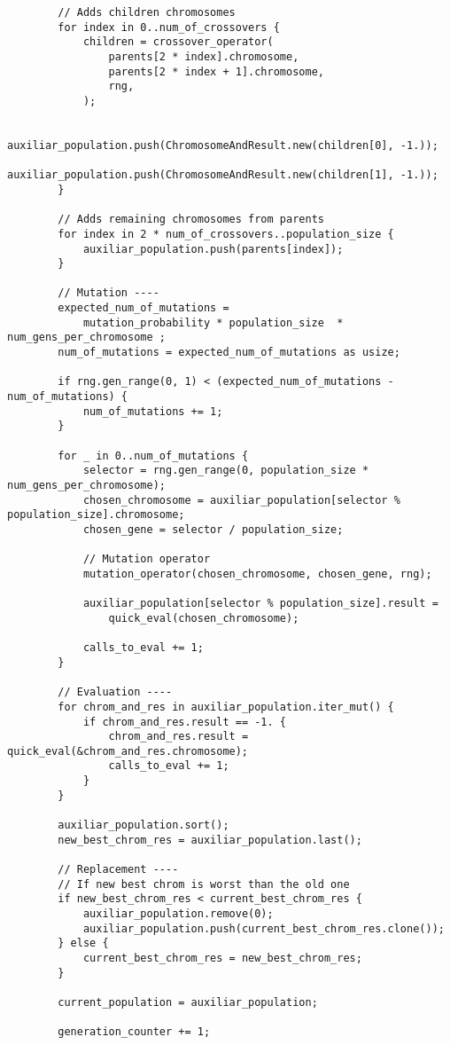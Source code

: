 \documentclass[size=a4, parskip=half, titlepage=false, toc=flat, toc=bib, 12pt]{scrartcl}
\begin{document}
\begin{verbatim}
        // Adds children chromosomes
        for index in 0..num_of_crossovers {
            children = crossover_operator(
                parents[2 * index].chromosome,
                parents[2 * index + 1].chromosome,
                rng,
            );

            auxiliar_population.push(ChromosomeAndResult.new(children[0], -1.));
            auxiliar_population.push(ChromosomeAndResult.new(children[1], -1.));
        }

        // Adds remaining chromosomes from parents
        for index in 2 * num_of_crossovers..population_size {
            auxiliar_population.push(parents[index]);
        }

        // Mutation ----
        expected_num_of_mutations =
            mutation_probability * population_size  * num_gens_per_chromosome ;
        num_of_mutations = expected_num_of_mutations as usize;

        if rng.gen_range(0, 1) < (expected_num_of_mutations - num_of_mutations) {
            num_of_mutations += 1;
        }

        for _ in 0..num_of_mutations {
            selector = rng.gen_range(0, population_size * num_gens_per_chromosome);
            chosen_chromosome = auxiliar_population[selector % population_size].chromosome;
            chosen_gene = selector / population_size;

            // Mutation operator
            mutation_operator(chosen_chromosome, chosen_gene, rng);

            auxiliar_population[selector % population_size].result =
                quick_eval(chosen_chromosome);

            calls_to_eval += 1;
        }

        // Evaluation ----
        for chrom_and_res in auxiliar_population.iter_mut() {
            if chrom_and_res.result == -1. {
                chrom_and_res.result = quick_eval(&chrom_and_res.chromosome);
                calls_to_eval += 1;
            }
        }

        auxiliar_population.sort();
        new_best_chrom_res = auxiliar_population.last();

        // Replacement ----
        // If new best chrom is worst than the old one
        if new_best_chrom_res < current_best_chrom_res {
            auxiliar_population.remove(0);
            auxiliar_population.push(current_best_chrom_res.clone());
        } else {
            current_best_chrom_res = new_best_chrom_res;
        }

        current_population = auxiliar_population;

        generation_counter += 1;

\end{verbatim}
\end{document}

